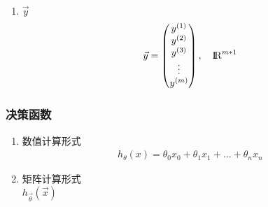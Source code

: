 \begin{enumerate}
\item $\vec{y}$
\begin{equation}
	\vec{y} = \left(\begin{matrix}
		y^{(1)} \\ y^{(2)} \\ y^{(3)} \\ \vdots \\ y^{(m)}
	\end{matrix}\right), \quad {\rm I\!R}^{{m*1}}
\end{equation}
\end{enumerate}

\subsubsection{决策函数}
\begin{enumerate}
	\item 数值计算形式 \\
	\begin{align}
		h_{\theta}(x) = \theta_0 x_0 + \theta_1 x_1 + \dots + \theta_n x_n
	\end{align}
	\item 矩阵计算形式 \\ 
	$h_{\vec{\theta}}(\vec{x})$


\end{enumerate}
